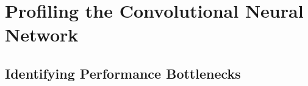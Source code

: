 
\section{Profiling the Convolutional Neural Network}
\label{sec-profiling}

\subsection{Identifying Performance Bottlenecks}
